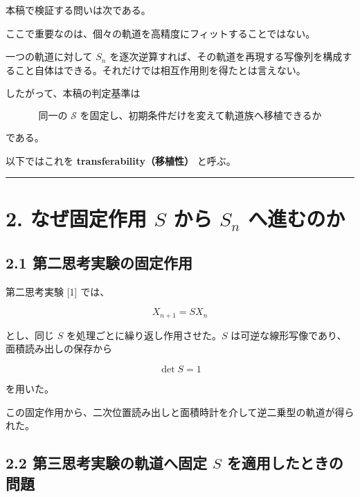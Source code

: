 \documentclass[
  a4paper,
]{ltjsarticle}
\begin{document}
本稿で検証する問いは次である。

\begin{center}
\end{center}

ここで重要なのは、個々の軌道を高精度にフィットすることではない。

一つの軌道に対して \(S_n\)
を逐次逆算すれば、その軌道を再現する写像列を構成すること自体はできる。それだけでは相互作用則を得たとは言えない。

したがって、本稿の判定基準は

\[
\boxed{
\text{同一の }\mathcal S\text{ を固定し、初期条件だけを変えて軌道族へ移植できるか}
}
\]

である。

以下ではこれを \textbf{transferability（移植性）} と呼ぶ。

\begin{center}\rule{0.5\linewidth}{0.5pt}\end{center}

\section{\texorpdfstring{2. なぜ固定作用 \(S\) から \(S_n\)
へ進むのか}{2. なぜ固定作用 S から S\_n へ進むのか}}\label{ux306aux305cux56faux5b9aux4f5cux7528-s-ux304bux3089-s_n-ux3078ux9032ux3080ux306eux304b}

\subsection{2.1
第二思考実験の固定作用}\label{ux7b2cux4e8cux601dux8003ux5b9fux9a13ux306eux56faux5b9aux4f5cux7528}

第二思考実験 {[}1{]} では、

\[
X_{n+1}=SX_n
\]

とし、同じ \(S\) を処理ごとに繰り返し作用させた。\(S\)
は可逆な線形写像であり、面積読み出しの保存から

\[
\det S=1
\]

を用いた。

この固定作用から、二次位置読み出しと面積時計を介して逆二乗型の軌道が得られた。

\subsection{\texorpdfstring{2.2 第三思考実験の軌道へ固定 \(S\)
を適用したときの問題}{2.2 第三思考実験の軌道へ固定 S を適用したときの問題}}\label{ux7b2cux4e09ux601dux8003ux5b9fux9a13ux306eux8eccux9053ux3078ux56faux5b9a-s-ux3092ux9069ux7528ux3057ux305fux3068ux304dux306eux554fux984c}
\end{document}
